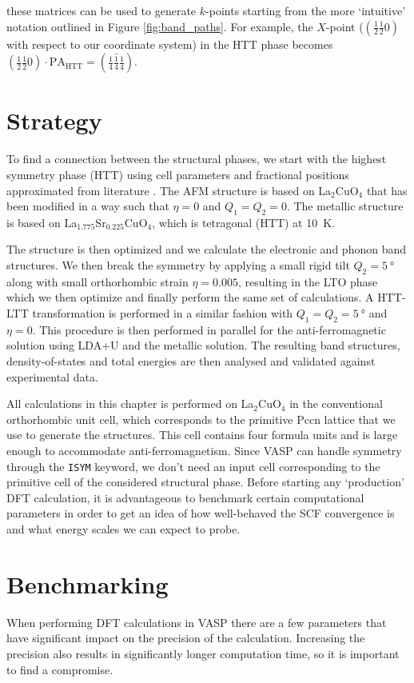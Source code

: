 \noindent these matrices can be used to generate $k$-points starting from the more `intuitive' notation outlined in Figure \ref{fig:band_paths}. For example, the $X$-point ($(\frac{1}{2} \frac{1}{2} 0)$ with respect to our coordinate system) in the HTT phase becomes $(\frac{1}{2} \frac{1}{2} 0) \cdot \text{PA}_\text{HTT} = (\frac{1}{4} \bar{\frac{1}{4}} \frac{1}{4})$.

\section{Strategy}
To find a connection between the structural phases, we start with the highest symmetry phase (HTT) using cell parameters and fractional positions approximated from literature \cite{Radaelli1994a}. The AFM structure is based on La$_2$CuO$_4$ that has been modified in a way such that $\eta=0$ and $Q_1 = Q_2 = 0$. The metallic structure is based on La$_{1.775}$Sr$_{0.225}$CuO$_4$, which is tetragonal (HTT) at \SI{10}{\kelvin}.

The structure is then optimized and we calculate the electronic and phonon band structures. We then break the symmetry by applying a small rigid tilt $Q_2 = \SI{5}{\degree}$ along with small orthorhombic strain $\eta = 0.005$, resulting in the LTO phase which we then optimize and finally perform the same set of calculations. A HTT-LTT transformation is performed in a similar fashion with $Q_1 = Q_2 = \SI{5}{\degree}$ and $\eta = 0$. This procedure is then performed in parallel for the anti-ferromagnetic solution using LDA+U and the metallic solution. The resulting band structures, density-of-states and total energies are then analysed and validated against experimental data. 

All calculations in this chapter is performed on La$_2$CuO$_4$ in the conventional orthorhombic unit cell, which corresponds to the primitive Pccn lattice that we use to generate the structures. This cell contains four formula units and is large enough to accommodate anti-ferromagnetism. Since VASP can handle symmetry through the \texttt{ISYM} keyword, we don't need an input cell corresponding to the primitive cell of the considered structural phase. Before starting any `production' DFT calculation, it is advantageous to benchmark certain computational parameters in order to get an idea of how well-behaved the SCF convergence is and what energy scales we can expect to probe.

\section{Benchmarking}\label{sec:sim_benchmark}
When performing DFT calculations in VASP there are a few parameters that have significant impact on the precision of the calculation. Increasing the precision also results in significantly longer computation time, so it is important to find a compromise. 

